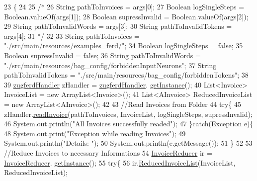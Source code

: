 \begin{DoxyCode}
23                                                               \{
24         
25         \textcolor{comment}{/*}
26 \textcolor{comment}{        String pathToInvoices = args[0];}
27 \textcolor{comment}{        Boolean logSingleSteps = Boolean.valueOf(args[1]);}
28 \textcolor{comment}{        Boolean supressInvalid = Boolean.valueOf(args[2]);}
29 \textcolor{comment}{        String pathToInvalidWords = args[3];}
30 \textcolor{comment}{        String pathToInvalidTokens = args[4];}
31 \textcolor{comment}{        */}
32         
33         String pathToInvoices = \textcolor{stringliteral}{"./src/main/resources/examples\_ferd/"};
34         Boolean logSingleSteps = \textcolor{keyword}{false};
35         Boolean supressInvalid = \textcolor{keyword}{false};
36         String pathToInvalidWords = \textcolor{stringliteral}{"./src/main/resources/bag\_config/forbiddenInputNeurons"};
37         String pathToInvalidTokens = \textcolor{stringliteral}{"./src/main/resources/bag\_config/forbiddenTokens"};
38         
39         \hyperlink{class_import_1_1zugferd_handler}{zugferdHandler} zHandler = \hyperlink{class_import_1_1zugferd_handler}{zugferdHandler}.
      \hyperlink{class_import_1_1zugferd_handler_ad3acd84340c8a5fcb2c01a2636979786}{getInstance}();
40         List<Invoice> InvoiceList = \textcolor{keyword}{new} ArrayList<Invoice>();
41         List<AInvoice> ReducedInvoiceList = \textcolor{keyword}{new} ArrayList<AInvoice>();
42         
43         \textcolor{comment}{//Read Invoices from Folder}
44         \textcolor{keywordflow}{try}\{
45             zHandler.\hyperlink{class_import_1_1zugferd_handler_aea79c23595f003c943e908c95276ecf9}{readInvoice}(pathToInvoices, InvoiceList, logSingleSteps, supressInvalid);
46             System.out.println(\textcolor{stringliteral}{"All Invoices successfully readed"});
47         \}\textcolor{keywordflow}{catch}(Exception e)\{
48             System.out.print(\textcolor{stringliteral}{"Exception while reading Invoices"});
49             System.out.println(\textcolor{stringliteral}{"Details: "});
50             System.out.println(e.getMessage());
51         \}
52         
53         \textcolor{comment}{//Reduce Invoices to necessary Informations}
54         \hyperlink{class_reduced_invoice_1_1_invoice_reducer}{InvoiceReducer} ir = \hyperlink{class_reduced_invoice_1_1_invoice_reducer}{InvoiceReducer}.
      \hyperlink{class_reduced_invoice_1_1_invoice_reducer_ad4fafc7b331a78ef243c3e3ba88803da}{getInstance}();
55         \textcolor{keywordflow}{try}\{
56             ir.\hyperlink{class_reduced_invoice_1_1_invoice_reducer_af064188d62db15e810468e4811af6cc5}{ReducedInvoiceList}(InvoiceList, ReducedInvoiceList);

\end{DoxyCode}
